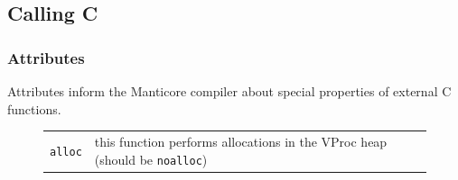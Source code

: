\documentclass[11pt]{article}
\begin{document}
\subsection{Calling C}
\subsubsection{Attributes}
Attributes inform the Manticore compiler about special properties of external C functions.

\begin{figure}
  \begin{center}
    \begin{tabular}{cl}
      {\tt alloc} & this function performs allocations in the VProc heap (should be {\tt noalloc})
    \end{tabular}
  \end{center}
  \label{fig:c-attributes}
\end{figure}
\end{document}
